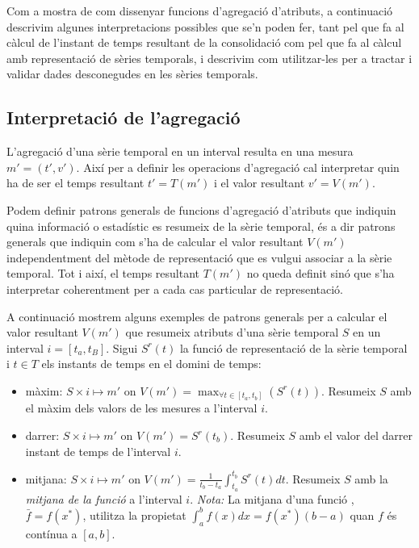 Com a mostra de com dissenyar funcions d'agregació d'atributs, a
continuació descrivim algunes interpretacions possibles que se'n poden
fer, tant pel que fa al càlcul de l'instant de temps resultant de la
consolidació com pel que fa al càlcul amb representació de sèries
temporals, i descrivim com utilitzar-les per a tractar i validar dades
desconegudes en les sèries temporals.



\subsection{Interpretació de l'agregació}


L'agregació d'una sèrie temporal en un interval resulta en una mesura
$m'=(t',v')$. Així per a definir les operacions d'agregació cal
interpretar quin ha de ser el temps resultant $t'=T(m')$ i el valor
resultant $v'=V(m')$.


Podem definir patrons generals de funcions d'agregació d'atributs que
indiquin quina informació o estadístic es resumeix de la sèrie
temporal, és a dir patrons generals que indiquin com s'ha de calcular
el valor resultant $V(m')$ independentment del mètode de representació
que es vulgui associar a la sèrie temporal.  Tot i així, el temps
resultant $T(m')$ no queda definit sinó que s'ha interpretar
coherentment per a cada cas particular de representació.


A continuació mostrem alguns exemples de patrons generals per a
calcular el valor resultant $V(m')$ que resumeix atributs d'una sèrie
temporal $S$ en un interval $i=[t_a,t_B]$. Sigui $S^r(t)$ la funció de
representació de la sèrie temporal i $t\in T$ els instants de temps
en el domini de temps:
\begin{itemize}
\item màxim: $S \times i \mapsto m'$ on $V(m') = \max_{\forall t \in
    [t_a,t_b]}(S^r(t))$. Resumeix $S$ amb el màxim dels valors de les
  mesures a l'interval $i$.
\item darrer: $S \times i \mapsto m'$ on $V(m') = S^r(t_b)$. Resumeix
  $S$ amb el valor del darrer instant de temps de l'interval $i$.

\item mitjana: $S \times i \mapsto m'$ on $V(m') = \frac{1}{t_b-t_a}
  \int_{t_a}^{t_b} S^r(t)dt$. Resumeix $S$ amb la \emph{mitjana de la
    funció} a l'interval $i$. \emph{Nota:} La mitjana d'una
  funció \parencite{weisstein:averagefunction}, $\bar f=f(x^*)$,
  utilitza la propietat $\int_a^b f(x)dx = f(x^*)(b-a)$ quan $f$ és
  contínua a $[a,b]$. \label{sec:sgstm:mitjanafuncio}

\end{itemize}




